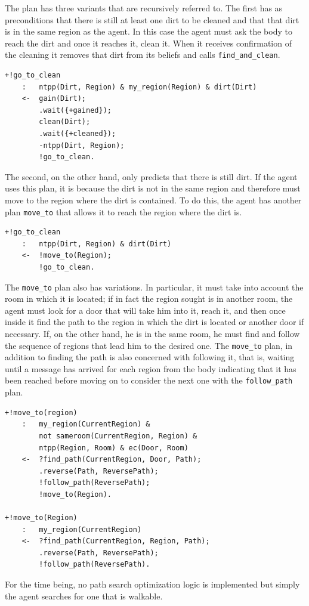 The plan has three variants that are recursively referred to.
The first has as preconditions that there is still at least one dirt to be cleaned and that that dirt is in the same region as the agent.
In this case the agent must ask the body to reach the dirt and once it reaches it, clean it.
When it receives confirmation of the cleaning it removes that dirt from its beliefs and calls \texttt{find\_and\_clean}.
\begin{lstlisting}[language=AgentSpeak]
+!go_to_clean
    :   ntpp(Dirt, Region) & my_region(Region) & dirt(Dirt)
    <-  gain(Dirt);
        .wait({+gained});
        clean(Dirt);
        .wait({+cleaned});
        -ntpp(Dirt, Region);
        !go_to_clean.
\end{lstlisting}
The second, on the other hand, only predicts that there is still dirt.
If the agent uses this plan, it is because the dirt is not in the same region and therefore must move to the region where the dirt is contained.
To do this, the agent has another plan \texttt{move\_to} that allows it to reach the region where the dirt is.
\begin{lstlisting}[language=AgentSpeak]
+!go_to_clean
    :   ntpp(Dirt, Region) & dirt(Dirt)
    <-  !move_to(Region);
        !go_to_clean.
\end{lstlisting}
The \texttt{move\_to} plan also has variations.
In particular, it must take into account the room in which it is located; if in fact the region sought is in another room, the agent must look for a door that will take him into it, reach it, and then once inside it find the path to the region in which the dirt is located or another door if necessary.
If, on the other hand, he is in the same room, he must find and follow the sequence of regions that lead him to the desired one.
The \texttt{move\_to} plan, in addition to finding the path is also concerned with following it, that is, waiting until a message has arrived for each region from the body indicating that it has been reached before moving on to consider the next one with the \texttt{follow\_path} plan.
\begin{lstlisting}[language=AgentSpeak]
+!move_to(region)
    :   my_region(CurrentRegion) & 
        not sameroom(CurrentRegion, Region) & 
        ntpp(Region, Room) & ec(Door, Room)
    <-  ?find_path(CurrentRegion, Door, Path);
        .reverse(Path, ReversePath);
        !follow_path(ReversePath);
        !move_to(Region).

+!move_to(Region)
    :   my_region(CurrentRegion)
    <-  ?find_path(CurrentRegion, Region, Path);
        .reverse(Path, ReversePath);
        !follow_path(ReversePath).
\end{lstlisting}
For the time being, no path search optimization logic is implemented but simply the agent searches for one that is walkable.

